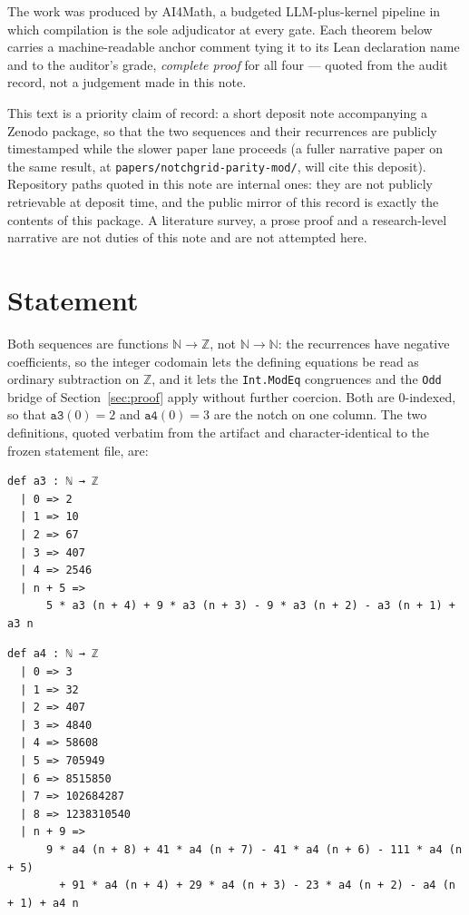 \documentclass[11pt]{article}
\begin{document}
The work was produced by AI4Math, a budgeted LLM-plus-kernel pipeline in which
compilation is the sole adjudicator at every gate. Each theorem below carries a
machine-readable anchor comment tying it to its Lean declaration name and to the
auditor's grade, \emph{complete proof} for all four --- quoted from the audit
record, not a judgement made in this note.

This text is a priority claim of record: a short deposit note accompanying a
Zenodo package, so that the two sequences and their recurrences are publicly
timestamped while the slower paper lane proceeds (a fuller narrative paper on the
same result, at \texttt{papers/notchgrid-parity-mod/}, will cite this deposit).
Repository paths quoted in this note are internal ones: they are not publicly
retrievable at deposit time, and the public mirror of this record is exactly the
contents of this package. A literature survey, a prose proof and a research-level
narrative are not duties of this note and are not attempted here.

\section{Statement}\label{sec:stmt}

Both sequences are functions $\mathbb{N} \to \mathbb{Z}$, not $\mathbb{N} \to
\mathbb{N}$: the recurrences have negative coefficients, so the integer codomain
lets the defining equations be read as ordinary subtraction on $\mathbb{Z}$, and
it lets the \texttt{Int.ModEq} congruences and the \texttt{Odd} bridge of
Section~\ref{sec:proof} apply without further coercion. Both are $0$-indexed, so
that $\texttt{a3}(0) = 2$ and $\texttt{a4}(0) = 3$ are the notch on one column.
The two definitions, quoted verbatim from the artifact and character-identical to
the frozen statement file, are:

\begin{lstlisting}[caption={\texttt{a3}: five initial values, order-5 recurrence
(verbatim excerpt, lines 24--31 of \texttt{final/01-notch-proved.lean}).},
label={lst:a3def}]
def a3 : ℕ → ℤ
  | 0 => 2
  | 1 => 10
  | 2 => 67
  | 3 => 407
  | 4 => 2546
  | n + 5 =>
      5 * a3 (n + 4) + 9 * a3 (n + 3) - 9 * a3 (n + 2) - a3 (n + 1) + a3 n
\end{lstlisting}

\begin{lstlisting}[caption={\texttt{a4}: nine initial values, order-9 recurrence
(verbatim excerpt, lines 151--163). The order 9 is reported as found: it exceeds
the order 3--6 the external proposal anticipated.},label={lst:a4def}]
def a4 : ℕ → ℤ
  | 0 => 3
  | 1 => 32
  | 2 => 407
  | 3 => 4840
  | 4 => 58608
  | 5 => 705949
  | 6 => 8515850
  | 7 => 102684287
  | 8 => 1238310540
  | n + 9 =>
      9 * a4 (n + 8) + 41 * a4 (n + 7) - 41 * a4 (n + 6) - 111 * a4 (n + 5)
        + 91 * a4 (n + 4) + 29 * a4 (n + 3) - 23 * a4 (n + 2) - a4 (n + 1) + a4 n
\end{lstlisting}
\end{document}
